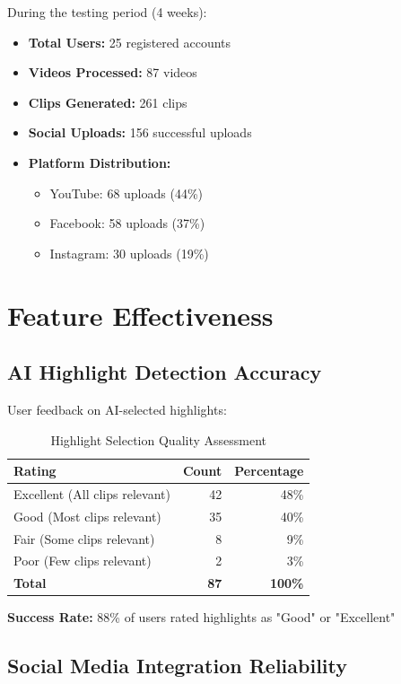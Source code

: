 During the testing period (4 weeks):
\begin{itemize}
    \item \textbf{Total Users:} 25 registered accounts
    \item \textbf{Videos Processed:} 87 videos
    \item \textbf{Clips Generated:} 261 clips
    \item \textbf{Social Uploads:} 156 successful uploads
    \item \textbf{Platform Distribution:}
    \begin{itemize}
        \item YouTube: 68 uploads (44\%)
        \item Facebook: 58 uploads (37\%)
        \item Instagram: 30 uploads (19\%)
    \end{itemize}
\end{itemize}

\section{Feature Effectiveness}

\subsection{AI Highlight Detection Accuracy}

User feedback on AI-selected highlights:

\begin{table}[H]
\centering
\caption{Highlight Selection Quality Assessment}
\begin{tabular}{@{}lrr@{}}
\toprule
\textbf{Rating} & \textbf{Count} & \textbf{Percentage} \\
\midrule
Excellent (All clips relevant) & 42 & 48\% \\
Good (Most clips relevant) & 35 & 40\% \\
Fair (Some clips relevant) & 8 & 9\% \\
Poor (Few clips relevant) & 2 & 3\% \\
\midrule
\textbf{Total} & \textbf{87} & \textbf{100\%} \\
\bottomrule
\end{tabular}
\end{table}

\textbf{Success Rate:} 88\% of users rated highlights as "Good" or "Excellent"

\subsection{Social Media Integration Reliability}

